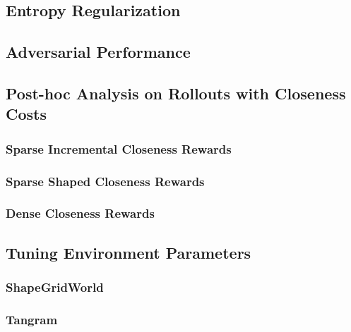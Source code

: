 \subsection{Entropy Regularization}
\label{sec:entropy-regularization}


\subsection{Adversarial Performance}
\label{sec:adversarial-performance}


\subsection{Post-hoc Analysis on Rollouts with Closeness Costs}
\label{sec:closeness-rollouts}


\subsubsection{Sparse Incremental Closeness Rewards}
\label{sec:sparse-incremental-closeness}


\subsubsection{Sparse Shaped Closeness Rewards}
\label{sec:sparse-shaped-closeness}


\subsubsection{Dense Closeness Rewards}
\label{sec:dense-closeness}


\subsection{Tuning Environment Parameters}
\label{sec:env-hyperparameters}


\subsubsection{ShapeGridWorld}
\label{sec:sgw-parameters}


\subsubsection{Tangram}
\label{sec:tangram-parameters}


